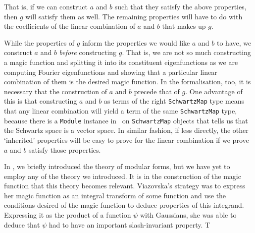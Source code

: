 That is, if we can construct $a$ and $b$ such that they satisfy the above properties, then $g$ will satisfy them as well. The remaining properties will have to do with the coefficients of the linear combination of $a$ and $b$ that makes up $g$.

While the properties of $g$ inform the properties we would like $a$ and $b$ to have, we construct $a$ and $b$ \textit{before} constructing $g$. That is, we are not so much constructing a magic function and splitting it into its constituent eigenfunctions as we are computing Fourier eigenfunctions and showing that a particular linear combination of them is the desired magic function. In the formalisation, too, it is necessary that the construction of $a$ and $b$ precede that of $g$. One advantage of this is that constructing $a$ and $b$ as terms of the right \verb|SchwartzMap| type means that any linear combination will yield a term of the same \verb|SchwartzMap| type, because there is a \verb|Module| instance in \mathlib\ on \verb|SchwartzMap| objects that tells us that the Schwartz space is a vector space. In similar fashion, if less directly, the other `inherited' properties will be easy to prove for the linear combination if we prove $a$ and $b$ satisfy those properties.

 In , we briefly introduced the theory of modular forms, but we have yet to employ any of the theory we introduced. It is in the construction of the magic function that this theory becomes relevant. Viazovska's strategy was to express her magic function as an integral transform of some function and use the conditions desired of the magic function to deduce properties of this integrand. Expressing it as the product of a function $\psi$ with Gaussians, she was able to deduce that $\psi$ had to have an important slash-invariant property. T

\begin{comment}
    ** Note: we gotta include PolyFourierCoeffBound somewhere!! **

    Maybe it's better to say ``here's how Viazovska did it'' and just outline her paper and then say ``here's what's different about the overall structure in Lean'' and outline a few things like the way we decided to structure the MagicFunction bit of the repo. Things like
    1. Wanting reusability: keeping `PolyFourierCoeffBound` separate
    2. Modularity: splitting it up from `ModularForms`
    3. Namespacing to avoid clashes (eg. a as a function and a as a SchwartzMap term)
    4. The strategy for the integrals: using real parametrisations and using straight contours instead of circular ones
\end{comment}